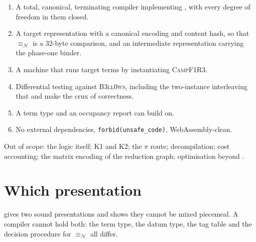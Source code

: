\documentclass[11pt,a4paper]{article}
\newcommand{\code}[1]{\texttt{#1}}
\newcommand{\Camp}{\textsc{CampF1R3}}
\newcommand{\Bell}{\textsc{B3ll0ws}}
\newcommand{\nequiv}{\equiv_{\mathcal{N}}}
\theoremstyle{definition}
\theoremstyle{plain}
\begin{document}
\begin{enumerate}[leftmargin=1.6em]
\item A total, canonical, terminating compiler implementing
\cite[Def.~6.3 and~6.8]{draft3}, with every degree of freedom in them closed.
\item A target representation with a canonical encoding and content hash, so
that $\nequiv$ is a 32-byte comparison, and an intermediate representation
carrying the phase-one binder.
\item A machine that runs target terms by instantiating \Camp{}.
\item Differential testing against \Bell, including the two-instance
interleaving that \cite[\S6.1]{draft3} and \cite[Rem.~6.10]{draft3} make the
crux of correctness.
\item A term type and an occupancy report \cite{logic} can build on.
\item No external dependencies, \code{forbid(unsafe\_code)}, WebAssembly-clean.
\end{enumerate}

\noindent
Out of scope: the logic itself; K1 and K2; the $\pi$ route; decompilation;
cost accounting; the matrix encoding of the reduction graph; optimisation
beyond \cite[Rem.~6.4]{draft3}.

\section{Which presentation}\label{sec:which}

\cite[\S3.3]{draft3} gives two sound presentations and \cite[Rem.~3.2]{draft3}
shows they cannot be mixed piecemeal. A compiler cannot hold both: the term
type, the datum type, the tag table and the decision procedure for $\nequiv$
all differ.
\end{document}
